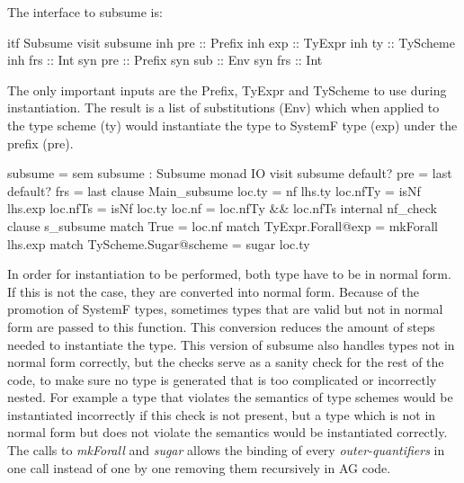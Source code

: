 The interface to subsume is:
\begin{code}
itf Subsume
  visit subsume
    inh pre  :: Prefix
    inh exp  :: TyExpr
    inh ty   :: TyScheme
    inh frs  :: Int
    syn pre  :: Prefix
    syn sub  :: Env
    syn frs  :: Int
\end{code}
The only important inputs are the Prefix, TyExpr and TyScheme to use during instantiation. The result is a list of substitutions (Env) which when applied to the type scheme (ty) would instantiate the type to SystemF type (exp) under the  prefix (pre).


\begin{code}
subsume = sem subsume : Subsume monad IO 
             visit subsume
               default? pre  =  last
               default? frs  =  last
               clause Main_subsume
                loc.ty    =  nf lhs.ty
                loc.nfTy  =  isNf lhs.exp
                loc.nfTs  =  isNf loc.ty
                loc.nf    =  loc.nfTy && loc.nfTs
                internal nf_check
                    clause s_subsume
                      match True                   =  loc.nf
                      match TyExpr.Forall@exp      =  mkForall lhs.exp
                      match TyScheme.Sugar@scheme  =  sugar loc.ty
\end{code}
In order for instantiation to be performed, both type have to be in normal form. If this is not the case, they are converted into normal form. Because of the promotion of SystemF types, sometimes types that are valid but not in normal form are passed to this function. This conversion reduces the amount of steps needed to instantiate the type. This version of subsume also handles types not in normal form correctly, but the checks serve as a sanity check for the rest of the code, to make sure no type is  generated that is too complicated or incorrectly nested. For example a type that violates the semantics of type schemes would be instantiated incorrectly if this check is not present, but a type which is not in normal form but does not violate the semantics would be instantiated correctly.
The calls to \emph{mkForall} and \emph{sugar} allows the binding of every \emph{outer-quantifiers} in one call instead of one by one removing them recursively in AG code.


